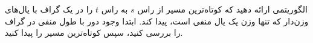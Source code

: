 الگوریتمی ارائه دهید که کوتاه‌ترین مسیر از راس $s$ به راس $t$ را در یک گراف با یال‌های وزن‌دار که تنها وزن یک یال منفی است، پیدا کند. ابتدا وجود دور با طول منفی در گراف را بررسی کنید، سپس کوتاه‌ترین مسیر را پیدا کنید.
